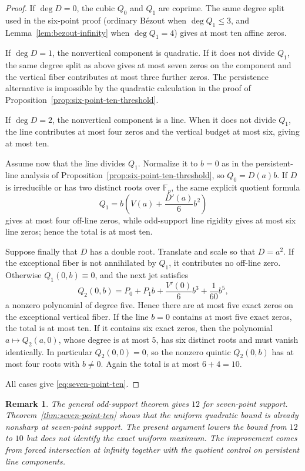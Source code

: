 \documentclass[11pt]{article}
\newtheorem{remark}[theorem]{Remark}
\newcommand{\F}{\mathbb F}
\begin{document}
\begin{proof}
If \(\deg D=0\), the cubic \(Q_0\) and \(Q_1\) are coprime.  The same degree split used in the six-point proof (ordinary B\'ezout when \(\deg Q_1\le3\), and Lemma~\ref{lem:bezout-infinity} when \(\deg Q_1=4\)) gives at most ten affine zeros.

If \(\deg D=1\), the nonvertical component is quadratic.  If it does
not divide \(Q_1\), the same degree split as above gives at most seven
zeros on the component and the vertical fiber contributes at most three
further zeros.  The persistence alternative is impossible by
the quadratic calculation in the proof of
Proposition~\ref{prop:six-point-ten-threshold}.

If \(\deg D=2\), the nonvertical component is a line.  When it does
not divide \(Q_1\), the line contributes at most four zeros and the
vertical budget at most six, giving at most ten.

Assume now that the line divides \(Q_1\).  Normalize it to \(b=0\) as in
the persistent-line analysis of Proposition~\ref{prop:six-point-ten-threshold},
so \(Q_0=D(a)b\).  If \(D\) is irreducible or has two distinct roots over
\(\F_p\), the same explicit quotient formula
\[
 Q_1=b\left(V(a)+\frac{D'(a)}6b^2\right)
\]
gives at most four off-line zeros, while odd-support line rigidity gives at
most six line zeros; hence the total is at most ten.

Suppose finally that \(D\) has a double root.  Translate and scale so that
\(D=a^2\).  If the exceptional fiber is not annihilated by \(Q_1\), it
contributes no off-line zero.  Otherwise \(Q_1(0,b)\equiv0\), and the next
jet satisfies
\[
 Q_2(0,b)=P_0+P_1b+\frac{V'(0)}6b^3+\frac1{60}b^5,
\]
a nonzero polynomial of degree five.  Hence there are at most five exact
zeros on the exceptional vertical fiber.  If the line \(b=0\) contains at
most five exact zeros, the total is at most ten.  If it contains six exact
zeros, then the polynomial \(a\mapsto Q_2(a,0)\), whose degree is at most
\(5\), has six distinct roots and must vanish identically.  In particular
\(Q_2(0,0)=0\), so the nonzero quintic \(Q_2(0,b)\) has at most four roots
with \(b\ne0\).  Again the total is at most \(6+4=10\).

All cases give \eqref{eq:seven-point-ten}.
\end{proof}

\begin{remark}
The general odd-support theorem gives \(12\) for seven-point support.
Theorem~\ref{thm:seven-point-ten} shows that the uniform quadratic
bound is already nonsharp at seven-point support.  The present argument
lowers the bound from $12$ to $10$ but does not identify the exact uniform
maximum.  The improvement comes from forced intersection at infinity
together with the quotient control on persistent line components.
\end{remark}
\end{document}
